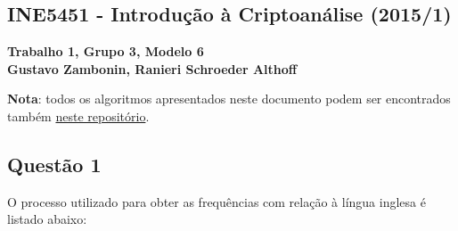 \documentclass{article}
\begin{document}
\begin{center}
    \section*{INE5451 - Introdução à Criptoanálise (2015/1)}
    \textbf{
        Trabalho 1, Grupo 3, Modelo 6 \\
        Gustavo Zambonin, Ranieri Schroeder Althoff
    }
\end{center}

\textbf{Nota}: todos os algoritmos apresentados neste documento podem ser
encontrados também \href{https://github.com/zambonin/ufsc-ine5451}{neste
repositório}.

\subsection*{Questão 1}

O processo utilizado para obter as frequências com relação à língua inglesa é
listado abaixo:
\end{document}
